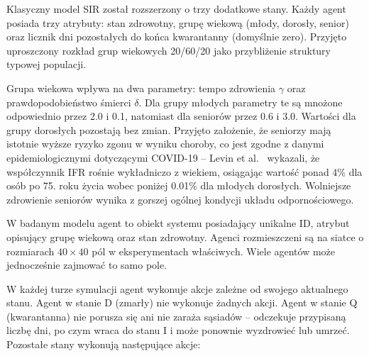 \documentclass[polish]{projectreport}
\begin{document}
Klasyczny model SIR został rozszerzony o trzy dodatkowe stany.
Każdy agent posiada trzy atrybuty: stan zdrowotny, grupę wiekową
(młody, dorosły, senior) oraz licznik dni pozostałych do końca
kwarantanny (domyślnie zero). Przyjęto uproszczony rozkład grup
wiekowych 20/60/20 jako przybliżenie struktury typowej populacji.

Grupa wiekowa wpływa na dwa parametry: tempo zdrowienia $\gamma$
oraz prawdopodobieństwo śmierci $\delta$. Dla grupy młodych parametry
te są mnożone odpowiednio przez 2.0 i 0.1, natomiast dla seniorów
przez 0.6 i 3.0. Wartości dla grupy dorosłych pozostają bez zmian.
Przyjęto założenie, że seniorzy mają istotnie wyższe ryzyko zgonu
w wyniku choroby, co jest zgodne z danymi epidemiologicznymi
dotyczącymi COVID-19 -- Levin et al.~\cite{levin2020age} wykazali,
że współczynnik IFR rośnie wykładniczo z wiekiem, osiągając wartość
ponad 4\% dla osób po 75. roku życia wobec poniżej 0.01\%
dla młodych dorosłych. Wolniejsze zdrowienie seniorów wynika
z gorszej ogólnej kondycji układu odpornościowego.

W badanym modelu agent to obiekt systemu posiadający unikalne ID,
atrybut opisujący grupę wiekową oraz stan zdrowotny. Agenci
rozmieszczeni są na siatce o rozmiarach $40 \times 40$ pól
w eksperymentach właściwych.
Wiele agentów może jednocześnie zajmować to samo pole.

W każdej turze symulacji agent wykonuje akcje zależne od swojego
aktualnego stanu. Agent w stanie D (zmarły) nie wykonuje żadnych
akcji. Agent w stanie Q (kwarantanna) nie porusza się ani nie zaraża
sąsiadów -- odczekuje przypisaną liczbę dni, po czym wraca do stanu
I i może ponownie wyzdrowieć lub umrzeć. Pozostałe stany wykonują
następujące akcje:
\end{document}
